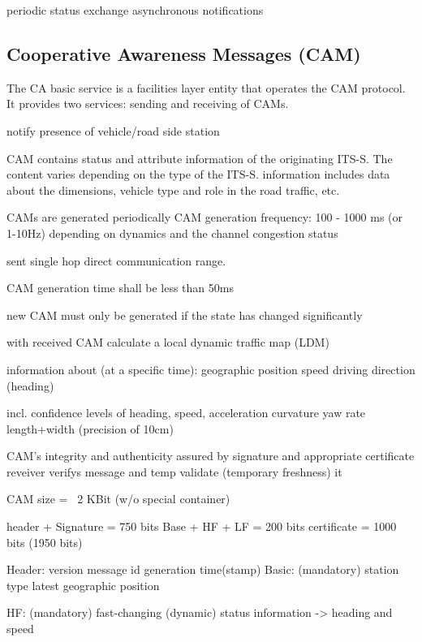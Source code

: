 periodic status exchange
asynchronous notifications

\subsection{Cooperative Awareness Messages (CAM)}

The CA basic service is a facilities layer entity that operates the CAM protocol. It provides two services: sending and receiving of CAMs.

notify presence of vehicle/road side station

CAM contains status and attribute information of the originating ITS-S.
The content varies depending on the type of the ITS-S.
information includes data about the dimensions, vehicle type and role in the road traffic, etc.


CAMs are generated periodically 
CAM generation frequency: 100 - 1000 ms (or 1-10Hz)
depending on dynamics and the channel congestion status

sent single hop
direct communication range.

CAM generation time shall be less than 50ms

new CAM must only be generated if the state has changed significantly


with received CAM calculate a local dynamic traffic map (LDM)


information about (at a specific time):
    geographic position
    speed
    driving direction (heading)

incl. confidence levels of
    heading,
    speed,
    acceleration
    curvature
    yaw rate
    length+width (precision of 10cm)

CAM's integrity and authenticity assured by signature and appropriate certificate
reveiver verifys message and temp validate (temporary freshness) it

CAM size                = ~2 KBit   (w/o special container)

header + Signature      =  750 bits
Base + HF + LF          =  200 bits
certificate             = 1000 bits
                         (1950 bits)

Header:
    version
    message id
    generation time(stamp)
Basic: (mandatory)
    station type
    latest geographic position
    
HF: (mandatory)
    fast-changing (dynamic) status information -> heading and speed
    
